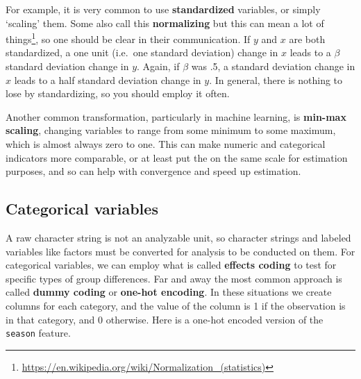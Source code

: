 \documentclass[
  letterpaper,
]{krantz}
\DeclareRobustCommand{\href}[2]{#2\footnote{\url{#1}}}
\begin{document}
For example, it is very common to use \textbf{standardized} variables,
or simply `scaling' them. Some also call this \textbf{normalizing} but
\href{https://en.wikipedia.org/wiki/Normalization_(statistics)}{this can
mean a lot of things}, so one should be clear in their communication. If
\(y\) and \(x\) are both standardized, a one unit (i.e.~one standard
deviation) change in \(x\) leads to a \(\beta\) standard deviation
change in \(y\). Again, if \(\beta\) was .5, a standard deviation change
in \(x\) leads to a half standard deviation change in \(y\). In general,
there is nothing to lose by standardizing, so you should employ it
often.

Another common transformation, particularly in machine learning, is
\textbf{min-max scaling}, changing variables to range from some minimum
to some maximum, which is almost always zero to one. This can make
numeric and categorical indicators more comparable, or at least put the
on the same scale for estimation purposes, and so can help with
convergence and speed up estimation.

\subsection{Categorical variables}\label{data-cat}

A raw character string is not an analyzable unit, so character strings
and labeled variables like factors must be converted for analysis to be
conducted on them. For categorical variables, we can employ what is
called \textbf{effects coding} to test for specific types of group
differences. Far and away the most common approach is called
\textbf{dummy coding} or \textbf{one-hot encoding}. In these situations
we create columns for each category, and the value of the column is 1 if
the observation is in that category, and 0 otherwise. Here is a one-hot
encoded version of the \texttt{season} feature.
\end{document}
